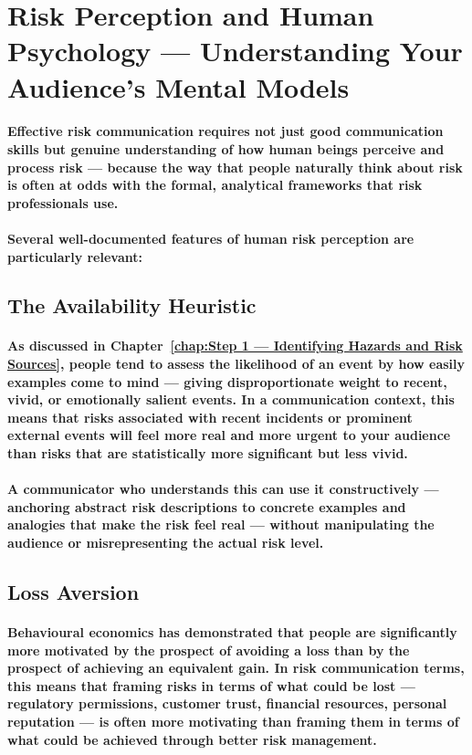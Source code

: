 \section{Risk Perception and Human Psychology — Understanding Your Audience's Mental Models}
\paragraph{Effective risk communication requires not just good communication skills but genuine understanding of how human beings perceive and process risk — because the way that people naturally think about risk is often at odds with the formal, analytical frameworks that risk professionals use.}
\paragraph{Several well-documented features of human risk perception are particularly relevant:}

\subsection{The Availability Heuristic}
\paragraph{As discussed in Chapter~\ref{chap:Step 1 — Identifying Hazards and Risk Sources}, people tend to assess the likelihood of an event by how easily examples come to mind — giving disproportionate weight to recent, vivid, or emotionally salient events. In a communication context, this means that risks associated with recent incidents or prominent external events will feel more real and more urgent to your audience than risks that are statistically more significant but less vivid.}
\paragraph{A communicator who understands this can use it constructively — anchoring abstract risk descriptions to concrete examples and analogies that make the risk feel real — without manipulating the audience or misrepresenting the actual risk level.}

\subsection{Loss Aversion}
\paragraph{Behavioural economics has demonstrated that people are significantly more motivated by the prospect of avoiding a loss than by the prospect of achieving an equivalent gain. In risk communication terms, this means that framing risks in terms of what could be lost — regulatory permissions, customer trust, financial resources, personal reputation — is often more motivating than framing them in terms of what could be achieved through better risk management.}
